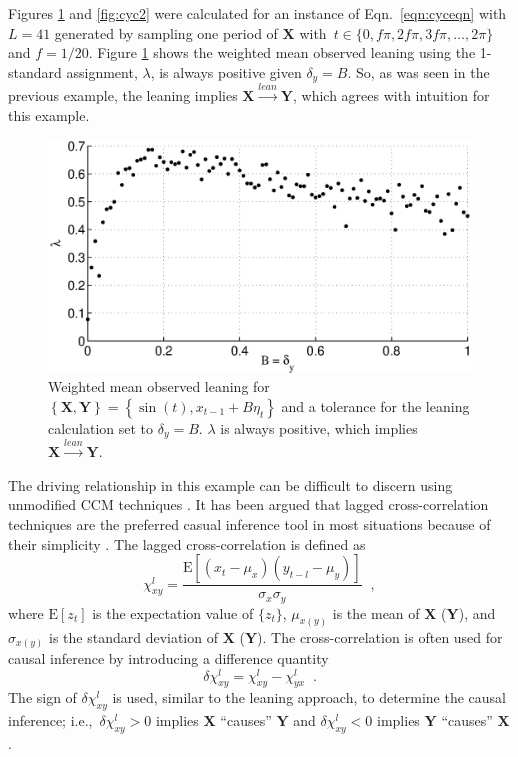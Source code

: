\documentclass[twocolumn,aps,pre,groupedaddress]{revtex4-1}
\begin{document}
Figures \ref{fig:cyc1} and \ref{fig:cyc2} were calculated for an instance of Eqn.\ \ref{eqn:cyceqn} with $L=41$ generated by sampling one period of $\mathbf{X}$ with\ $t\in\{0,f\pi,2f\pi,3f\pi,\ldots,2\pi\}$ and $f=1/20$.  Figure \ref{fig:cyc1} shows the weighted mean observed leaning using the 1-standard assignment, $\lambda$, is always positive given $\delta_y=B$.  So, as was seen in the previous example, the leaning implies $\mathbf{X}\xrightarrow{lean}\mathbf{Y}$, which agrees with intuition for this example. 
\begin{figure}[ht]
\includegraphics[scale=0.45]{SimpleCyclicexample_Bxytol.eps}
\caption{Weighted mean observed leaning for $\left\{\mathbf{X},\mathbf{Y}\right\} = \left\{\sin(t), x_{t-1} + B\eta_t\right\}$ and a tolerance for the leaning calculation set to $\delta_y=B$.  $\lambda$ is always positive, which implies $\mathbf{X}\xrightarrow{lean}\mathbf{Y}$.}
\label{fig:cyc1}
\end{figure}

The driving relationship in this example can be difficult to discern using unmodified CCM techniques \cite{Weigel2014}.  It has been argued that lagged cross-correlation techniques are the preferred casual inference tool in most situations because of their simplicity \cite{McNames2007}.  The lagged cross-correlation is defined as
\begin{equation}
\chi_{xy}^l = \frac{\mathrm{E}\left[\left(x_t-\mu_x\right)\left(y_{t-l}-\mu_y\right)\right]}{\sigma_x\sigma_y}\;\;,
\end{equation}
where $\mathrm{E}[z_t]$ is the expectation value of $\{z_t\}$, $\mu_{x(y)}$ is the mean of $\mathbf{X}$ ($\mathbf{Y}$), and $\sigma_{x(y)}$ is the standard deviation of $\mathbf{X}$ ($\mathbf{Y}$).  The cross-correlation is often used for causal inference by introducing a difference quantity \cite{Rogosa1980}
\begin{equation}
\delta\chi_{xy}^l = \chi_{xy}^l - \chi_{yx}^l\;\;.
\end{equation}
The sign of $\delta\chi_{xy}^l$ is used, similar to the leaning approach, to determine the causal inference; i.e.,\  $\delta\chi_{xy}^l>0$ implies $\mathbf{X}$ ``causes'' $\mathbf{Y}$ and $\delta\chi_{xy}^l<0$ implies $\mathbf{Y}$ ``causes'' $\mathbf{X}$ \cite{Rogosa1980}.  
\end{document}
